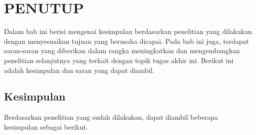 \chapter{PENUTUP}
\label{chap:penutup}

Dalam bab ini berisi mengenai kesimpulan berdasarkan penelitian yang dilakukan dengan menyesuaikan tujuan yang berusaha dicapai. Pada bab ini juga, terdapat saran-saran yang diberikan dalam rangka meningkatkan dan mengembangkan penelitian selanjutnya yang terkait dengan topik tugas akhir ini. Berikut ini adalah kesimpulan dan saran yang dapat diambil. 

\section{Kesimpulan}
\label{sec:kesimpulan}

Berdasarkan penelitian yang sudah dilakukan, dapat diambil beberapa kesimpulan sebagai berikut.

